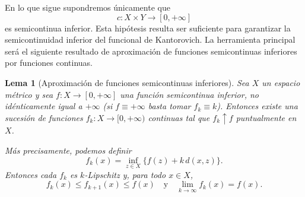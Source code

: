 \documentclass[12pt, a4paper]{amsbook}
\newtheorem{lema}[teo]{Lema}
\theoremstyle{remark}
\theoremstyle{definition}
\numberwithin{section}{chapter}
\numberwithin{subsection}{section}
\numberwithin{equation}{section}
\numberwithin{figure}{chapter}
\begin{document}
En lo que sigue supondremos únicamente que
\[
c\colon X\times Y\longrightarrow[0,+\infty]
\]
es semicontinua inferior. Esta hipótesis resulta ser suficiente para
garantizar la semicontinuidad inferior del funcional de Kantorovich. La
herramienta principal será el siguiente resultado de aproximación de
funciones semicontinuas inferiores por funciones continuas.

\begin{lema}[Aproximación de funciones semicontinuas inferiores]
Sea \(X\) un espacio métrico y sea
\(
f\colon X\longrightarrow[0,+\infty]
\)
una función semicontinua inferior, no idénticamente igual a \(+\infty\) (si
\(f\equiv+\infty\) basta tomar \(f_k\equiv k\)). Entonces existe una sucesión de funciones
\(
f_k\colon X\longrightarrow[0,+\infty)
\)
continuas tal que
\(
f_k\uparrow f
\)
puntualmente en \(X\).

Más precisamente, podemos definir
\[
f_k(x)
=
\inf_{z\in X}
\bigl\{
f(z)+k\,d(x,z)
\bigr\}.
\]
Entonces cada \(f_k\) es \(k\)-Lipschitz y, para todo \(x\in X\),
\[
f_k(x)\leq f_{k+1}(x)\leq f(x)
\quad
\text{y}
\quad
\lim_{k\to\infty}f_k(x)=f(x).
\]
\end{lema}
\end{document}
